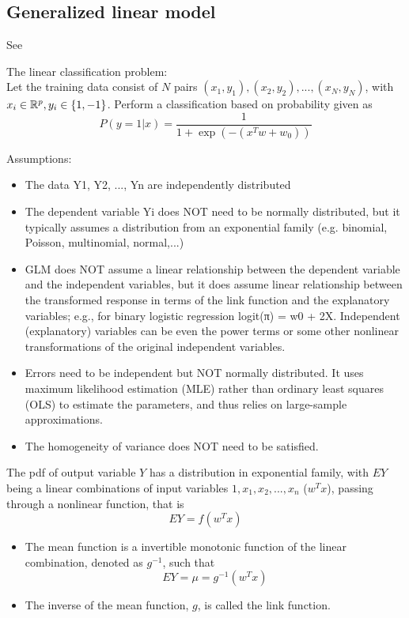 \begin{refsection}
\section{Generalized linear model}
See \cite[290]{murphy2012machine}

The linear classification problem:\\
Let the training data consist of $N$ pairs $(x_1,y_1),(x_2,y_2),...,(x_N,y_N)$, with $x_i \in \mathbb{R}^p, y_i \in \{1,-1\}$. 
Perform a classification based on probability given as $$P(y=1|x) = \frac{1}{1 + \exp(-(x^Tw + w_0))}$$


\begin{mdframed}
	Assumptions:
	\begin{itemize}
		\item The data Y1, Y2, ..., Yn are independently distributed
		\item The dependent variable Yi does NOT need to be normally distributed, but it typically assumes a distribution from an exponential family (e.g. binomial, Poisson, multinomial, normal,...)
		\item GLM does NOT assume a linear relationship between the dependent variable and the independent variables, but it does assume linear relationship between the transformed response in terms of the link function and the explanatory variables; e.g., for binary logistic regression logit(π) = w0 + 2X.
		Independent (explanatory) variables can be even the power terms or some other nonlinear transformations of the original independent variables.
		\item Errors need to be independent but NOT normally distributed.
		It uses maximum likelihood estimation (MLE) rather than ordinary least squares (OLS) to estimate the parameters, and thus relies on large-sample approximations.
		\item The homogeneity of variance does NOT need to be satisfied.	
	\end{itemize}
\end{mdframed}


\begin{definition}
	The pdf of output variable $Y$ has a distribution in exponential family, with $EY$ being a linear combinations of input variables $1,x_1,x_2,...,x_n$ ($w^Tx$), passing through a nonlinear function, that is
	$$EY = f(w^Tx)$$
	\begin{itemize}
		\item The mean function is a invertible monotonic function of the linear combination, denoted as $g^{-1}$, such that
		$$EY=\mu = g^{-1}(w^Tx)$$
		\item The inverse of the mean function, $g$, is called the link function.
	\end{itemize}
\end{definition}



\end{refsection}
